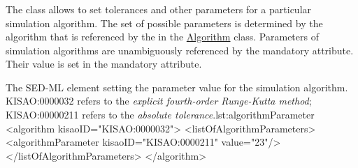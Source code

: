  \subsubsection{}
\label{class:algorithmParameter}

The  class allows to set tolerances and other parameters for a particular simulation algorithm. The set of possible parameters is determined by the algorithm that is referenced by the  in the \hyperref[class:algorithm]{Algorithm} class. Parameters of simulation algorithms are unambiguously referenced by the mandatory  attribute. Their value is set in the mandatory  attribute.

\begin{myXmlLst}{The SED-ML  element setting the parameter value for the simulation algorithm. KISAO:0000032 refers to the \emph{explicit fourth-order Runge-Kutta method}; KISAO:00000211 refers to the \emph{absolute tolerance}.}{lst:algorithmParameter}
<algorithm kisaoID="KISAO:0000032"> 
 <listOfAlgorithmParameters> 
  <algorithmParameter kisaoID="KISAO:0000211" value="23"/> 
 </listOfAlgorithmParameters> 
</algorithm>
\end{myXmlLst}

